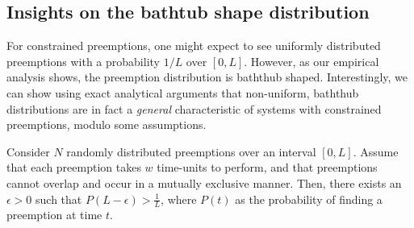 

\subsection{Insights on the bathtub shape distribution}

For constrained preemptions, one might expect to see uniformly distributed preemptions with a probability $1/L$ over $[0, L]$. 
However, as our empirical analysis shows, the preemption distribution is baththub shaped.
Interestingly, we can show using exact analytical arguments that non-uniform, baththub distributions are in fact a \emph{general} characteristic of systems with constrained preemptions, modulo some assumptions. 

\begin{lemma}
  Consider $N$ randomly distributed preemptions over an interval $[0, L]$.
  Assume that each preemption takes $w$ time-units to perform, and that preemptions cannot overlap and occur in a mutually exclusive manner.
  Then, there exists an $ \epsilon > 0$ such that  $P(L-\epsilon) > \frac{1}{L}$, where 
 $P(t)$ as the probability of finding a preemption at time $t$. 
\end{lemma}


